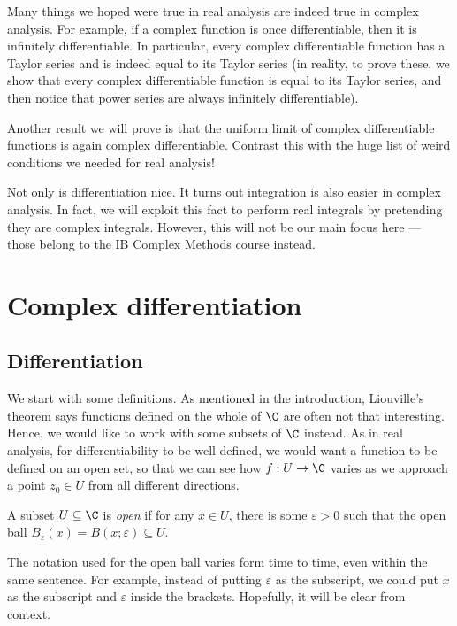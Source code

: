 \documentclass[a4paper]{article}
\begin{document}
Many things we hoped were true in real analysis are indeed true in complex analysis. For example, if a complex function is once differentiable, then it is infinitely differentiable. In particular, every complex differentiable function has a Taylor series and is indeed equal to its Taylor series (in reality, to prove these, we show that every complex differentiable function is equal to its Taylor series, and then notice that power series are always infinitely differentiable).

Another result we will prove is that the uniform limit of complex differentiable functions is again complex differentiable. Contrast this with the huge list of weird conditions we needed for real analysis!

Not only is differentiation nice. It turns out integration is also easier in complex analysis. In fact, we will exploit this fact to perform real integrals by pretending they are complex integrals. However, this will not be our main focus here --- those belong to the IB Complex Methods course instead.

\section{Complex differentiation}
\subsection{Differentiation}
We start with some definitions. As mentioned in the introduction, Liouville's theorem says functions defined on the whole of $\C$ are often not that interesting. Hence, we would like to work with some subsets of $\C$ instead. As in real analysis, for differentiability to be well-defined, we would want a function to be defined on an open set, so that we can see how $f: U \to \C$ varies as we approach a point $z_0 \in U$ from all different directions.

\begin{defi}
  A subset $U \subseteq \C$ is \emph{open} if for any $x \in U$, there is some $\varepsilon > 0$ such that the open ball $B_\varepsilon(x) = B(x; \varepsilon) \subseteq U$.
\end{defi}
The notation used for the open ball varies form time to time, even within the same sentence. For example, instead of putting $\varepsilon$ as the subscript, we could put $x$ as the subscript and $\varepsilon$ inside the brackets. Hopefully, it will be clear from context.
\end{document}
